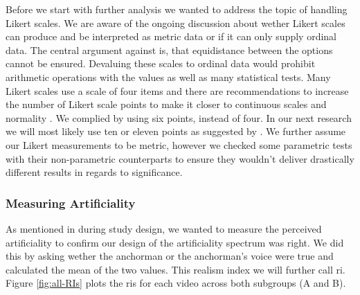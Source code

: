\documentclass[
  a4paper,  %
  twoside,  %
  bibliography=totoc,
  headsepline,
  cleardoublepage=empty,
  parskip=half,
  draft=false
]{scrbook}
\begin{document}
Before we start with further analysis we wanted to address the topic of handling Likert scales. We are aware of the ongoing discussion about wether Likert scales can produce and be interpreted as metric data or if it can only supply ordinal data. The central argument against is, that equidistance between the options cannot be ensured. Devaluing these scales to ordinal data would prohibit arithmetic operations with the values as well as many statistical tests. Many Likert scales use a scale of four items and there are recommendations to increase the number of Likert scale points to make it closer to continuous scales and normality \cite{wuCanLikertScales2017a}. We complied by using six points, instead of four. In our next research we will most likely use ten or eleven points as suggested by . We further assume our Likert measurements to be metric, however we checked some parametric tests with their non-parametric counterparts to ensure they wouldn't deliver drastically different results in regards to significance.

\subsubsection{Measuring Artificiality}

As mentioned in during study design, we wanted to measure the perceived artificiality to confirm our design of the artificiality spectrum was right. We did this by asking wether the anchorman or the anchorman's voice were true and calculated the mean of the two values. This realism index we will further call \gls{ri}. Figure \ref{fig:all-RIs} plots the \gls{ri}s for each video across both subgroups (A and B). 
\end{document}
